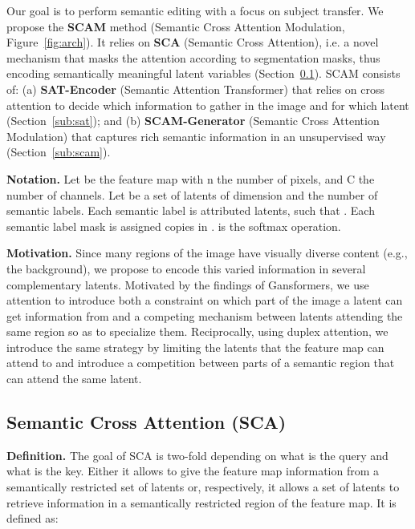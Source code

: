 \documentclass[runningheads]{llncs}
\makeatletter
\newcommand{\eg}{e.g.\@\xspace}
\newcommand{\ie}{i.e.\@\xspace}
\newcommand{\mname}{SCAM\@\xspace}
\makeatother
\begin{document}
Our goal is to perform semantic editing with a focus on subject transfer. We propose the \textbf{\mname} method (Semantic Cross Attention Modulation, Figure~\ref{fig:arch}).   
It relies on \textbf{SCA} (Semantic Cross Attention), \ie a novel mechanism that masks the attention according to segmentation masks, thus encoding semantically meaningful latent variables (Section~\ref{sub:sca}). 
\mname consists of: 
(a)  \textbf{SAT-Encoder} (Semantic Attention Transformer) that relies on cross attention to decide which information to gather in the image and for which latent (Section~\ref{sub:sat}); and  
(b)  \textbf{SCAM-Generator} (Semantic Cross Attention Modulation) that captures rich semantic information in an unsupervised way (Section~\ref{sub:scam}).



\noindent \textbf{Notation.}
Let  be the feature map with n the number of pixels, and C the number of channels. Let  be a set of  latents of dimension  and  the number of semantic labels. Each semantic label is attributed  latents, such that . Each semantic label mask is assigned  copies in .  is the softmax operation.

\noindent \textbf{Motivation.} Since many regions of the image have visually diverse content (\eg, the background), we propose to encode this varied information in several complementary latents. Motivated by the findings of Gansformers\cite{hudson2021generative}, we use attention to introduce both a constraint on which part of the image a latent can get information from and a competing mechanism between latents attending the same region so as to specialize them. Reciprocally, using duplex attention, we introduce the same strategy by limiting the latents that the feature map can attend to and introduce a competition between parts of a semantic region that can attend the same latent.




\subsection{Semantic Cross Attention (SCA)}
\label{sub:sca}

\noindent \textbf{Definition.} The goal of SCA is two-fold depending on what is the query and what is the key. Either it allows to give the feature map information from a semantically restricted set of latents or, respectively, it allows a set of latents to retrieve information in a semantically restricted region of the feature map. 
It is defined as:  
\end{document}
